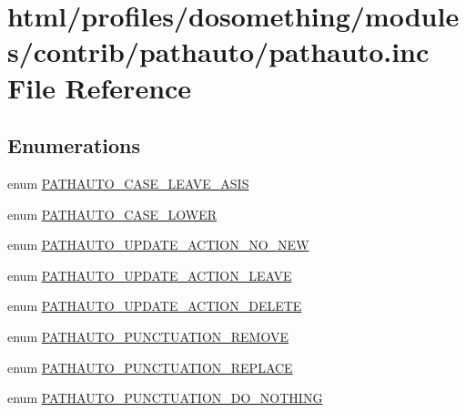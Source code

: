 \hypertarget{pathauto_8inc}{
\section{html/profiles/dosomething/modules/contrib/pathauto/pathauto.inc File Reference}
\label{pathauto_8inc}
}
\subsection*{Enumerations}
\begin{DoxyCompactItemize}
\item 
enum \hyperlink{pathauto_8inc_a70a76b2fb16c0b865f671bda8b720edb}{PATHAUTO\_\-CASE\_\-LEAVE\_\-ASIS} 
\item 
enum \hyperlink{pathauto_8inc_a35b6bbe534b05c42eeb8945b6ffe2a50}{PATHAUTO\_\-CASE\_\-LOWER} 
\item 
enum \hyperlink{pathauto_8inc_a70d61a7cceaca1c59abf30153aa8156c}{PATHAUTO\_\-UPDATE\_\-ACTION\_\-NO\_\-NEW} 
\item 
enum \hyperlink{pathauto_8inc_ad0bb9837044c24b6f3c0f4b2cd66c94b}{PATHAUTO\_\-UPDATE\_\-ACTION\_\-LEAVE} 
\item 
enum \hyperlink{pathauto_8inc_a54c9ce36014ab76dfc253cc8a4b0846b}{PATHAUTO\_\-UPDATE\_\-ACTION\_\-DELETE} 
\item 
enum \hyperlink{pathauto_8inc_af1defa37ae4d736ee2fd0701548faa6a}{PATHAUTO\_\-PUNCTUATION\_\-REMOVE} 
\item 
enum \hyperlink{pathauto_8inc_adad4cad26590ba34578f8f5e8e77e2de}{PATHAUTO\_\-PUNCTUATION\_\-REPLACE} 
\item 
enum \hyperlink{pathauto_8inc_a2b584fde6bb4b7c7fb17c3e2f9ca3b65}{PATHAUTO\_\-PUNCTUATION\_\-DO\_\-NOTHING} 
\end{DoxyCompactItemize}

